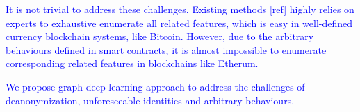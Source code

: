 \textcolor{blue}{
It is not trivial to address these challenges. Existing methods [ref] highly
relies on experts to exhaustive enumerate all related features, which is easy
in well-defined currency blockchain systems, like Bitcoin. However, due to the arbitrary behaviours
defined in smart contracts, it is
almost impossible to enumerate corresponding related features in blockchains
like Etherum. %
}


\textcolor{blue}{
  We propose graph deep learning approach to address the challenges of deanonymization,
  unforeseeable identities and arbitrary behaviours.
}





